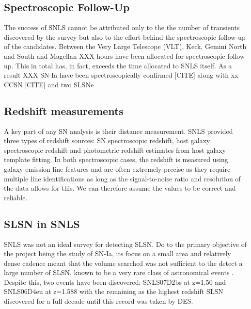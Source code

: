 \subsection{Spectroscopic Follow-Up}
The success of SNLS cannot be attributed only to the the number of transients discovered by the survey but also to the effort behind the spectroscopic follow-up of the candidates. Between the Very Large Telescope (VLT), Keck, Gemini North and South and Magellan XXX hours have been allocated for spectroscopic follow-up. This in total has, in fact, exceeds the time allocated to SNLS itself. As a result XXX SN-Ia have been spectroscopically confirmed [CITE] along with xx CCSN [CITE] and two SLSNe \citep{Howell2013TwoSurveyb}

\subsection{Redshift measurements}
A key part of any SN analysis is their distance measurement. SNLS provided three types of redshift sources: SN spectroscopic redshift, host galaxy spectroscopic redshift and photometric redshift estimates from host galaxy template fitting. In both spectroscopic cases, the redshift is measured using galaxy emission line features and are often extremely precise as they require multiple line identifications as long as the signal-to-noise ratio and resolution of the data allows for this. We can therefore assume the values to be correct and reliable.

\subsection{SLSN in SNLS}
SNLS was not an ideal survey for detecting SLSN. Do to the primary objective of the project being the study of SN-Ia, its focus on a small area and relatively dense cadence meant that the volume searched was not sufficient to the detect a large number of SLSN, known to be a very rare class of astronomical events \citep{Cooke2012Superluminous3.90.,Prajs2017The1,Quimby2013Rates0.2}. Despite this, two events have been discovered; SNLS07D2bs at z=1.50 and SNLS06D4eu at z=1.588 with the remaining as the highest redshift SLSN discovered for a full decade until this record was taken by DES.

